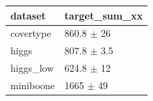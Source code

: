 \begin{tabular}{ll}
\toprule
dataset & target\_sum\_xx \\
\midrule
covertype & 860.8 $\pm$ 26 \\
higgs & 807.8 $\pm$ 3.5 \\
higgs\_low & 624.8 $\pm$ 12 \\
miniboone & 1665 $\pm$ 49 \\
\bottomrule
\end{tabular}
